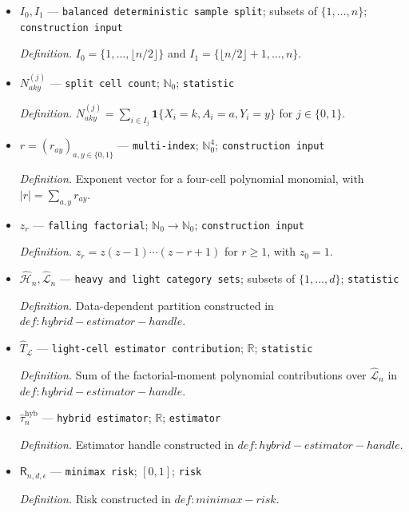 \documentclass{article}
\begin{document}
\begin{itemize}
  \item \(I_0,I_1\) --- \texttt{balanced deterministic sample split}; subsets of \(\{1,\ldots,n\}\); \texttt{construction input}
  \par\smallskip\noindent\emph{Definition.} \(I_0=\{1,\ldots,\lfloor n/2\rfloor\}\) and \(I_1=\{\lfloor n/2\rfloor+1,\ldots,n\}\).
  \item \(N^{(j)}_{aky}\) --- \texttt{split cell count}; \(\mathbb N_0\); \texttt{statistic}
  \par\smallskip\noindent\emph{Definition.} \(N^{(j)}_{aky}=\sum_{i\in I_j}\mathbf 1\{X_i=k,A_i=a,Y_i=y\}\) for \(j\in\{0,1\}\).
  \item \(r=(r_{ay})_{a,y\in\{0,1\}}\) --- \texttt{multi-index}; \(\mathbb N_0^4\); \texttt{construction input}
  \par\smallskip\noindent\emph{Definition.} Exponent vector for a four-cell polynomial monomial, with \( |r|=\sum_{a,y}r_{ay}\).
  \item \(z_r\) --- \texttt{falling factorial}; \(\mathbb N_0\to\mathbb N_0\); \texttt{construction input}
  \par\smallskip\noindent\emph{Definition.} \(z_r=z(z-1)\cdots(z-r+1)\) for \(r\ge1\), with \(z_0=1\).
  \item \(\widehat{\mathcal H}_n,\widehat{\mathcal L}_n\) --- \texttt{heavy and light category sets}; subsets of \(\{1,\ldots,d\}\); \texttt{statistic}
  \par\smallskip\noindent\emph{Definition.} Data-dependent partition constructed in \(def:hybrid-estimator-handle\).
  \item \(\widehat T_{\mathcal L}\) --- \texttt{light-cell estimator contribution}; \(\mathbb R\); \texttt{statistic}
  \par\smallskip\noindent\emph{Definition.} Sum of the factorial-moment polynomial contributions over \(\widehat{\mathcal L}_n\) in \(def:hybrid-estimator-handle\).
  \item \(\widehat\tau_n^{\mathrm{hyb}}\) --- \texttt{hybrid estimator}; \(\mathbb R\); \texttt{estimator}
  \par\smallskip\noindent\emph{Definition.} Estimator handle constructed in \(def:hybrid-estimator-handle\).
  \item \(\mathsf R_{n,d,\epsilon}\) --- \texttt{minimax risk}; \([0,1]\); \texttt{risk}
  \par\smallskip\noindent\emph{Definition.} Risk constructed in \(def:minimax-risk\).
\end{itemize}
\end{document}
